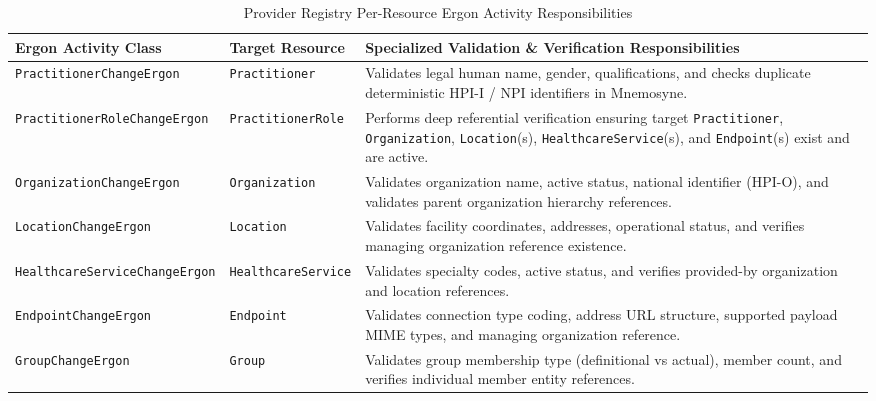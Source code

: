 \begin{table}[htbp]
\centering
\small
\begin{tabularx}{\textwidth}{l p{4.0cm} X}
\toprule
\textbf{Ergon Activity Class} & \textbf{Target Resource} & \textbf{Specialized Validation \& Verification Responsibilities} \\
\midrule
\texttt{PractitionerChangeErgon} & \texttt{Practitioner} & Validates legal human name, gender, qualifications, and checks duplicate deterministic HPI-I / NPI identifiers in Mnemosyne. \\
\addlinespace
\texttt{PractitionerRoleChangeErgon} & \texttt{PractitionerRole} & Performs deep referential verification ensuring target \texttt{Practitioner}, \texttt{Organization}, \texttt{Location}(s), \texttt{HealthcareService}(s), and \texttt{Endpoint}(s) exist and are active. \\
\addlinespace
\texttt{OrganizationChangeErgon} & \texttt{Organization} & Validates organization name, active status, national identifier (HPI-O), and validates parent organization hierarchy references. \\
\addlinespace
\texttt{LocationChangeErgon} & \texttt{Location} & Validates facility coordinates, addresses, operational status, and verifies managing organization reference existence. \\
\addlinespace
\texttt{HealthcareServiceChangeErgon} & \texttt{HealthcareService} & Validates specialty codes, active status, and verifies provided-by organization and location references. \\
\addlinespace
\texttt{EndpointChangeErgon} & \texttt{Endpoint} & Validates connection type coding, address URL structure, supported payload MIME types, and managing organization reference. \\
\addlinespace
\texttt{GroupChangeErgon} & \texttt{Group} & Validates group membership type (definitional vs actual), member count, and verifies individual member entity references. \\
\bottomrule
\end{tabularx}
\caption{Provider Registry Per-Resource Ergon Activity Responsibilities}
\label{tab:pr_erga_catalog}
\end{table}

